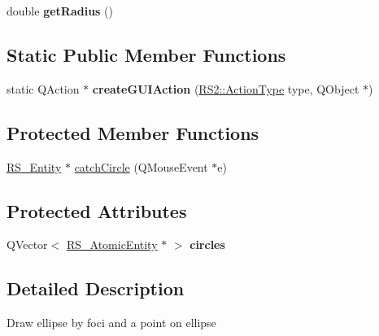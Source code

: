 \begin{DoxyCompactItemize}
\item 
\hypertarget{classRS__ActionDrawCircleTan2_adf0273951204c2c4d395948b033422e0}{double {\bfseries get\-Radius} ()}\label{classRS__ActionDrawCircleTan2_adf0273951204c2c4d395948b033422e0}

\end{DoxyCompactItemize}
\subsection*{Static Public Member Functions}
\begin{DoxyCompactItemize}
\item 
\hypertarget{classRS__ActionDrawCircleTan2_a77b6ab49046c06413214922cef22e671}{static Q\-Action $\ast$ {\bfseries create\-G\-U\-I\-Action} (\hyperlink{classRS2_afe3523e0bc41fd637b892321cfc4b9d7}{R\-S2\-::\-Action\-Type} type, Q\-Object $\ast$)}\label{classRS__ActionDrawCircleTan2_a77b6ab49046c06413214922cef22e671}

\end{DoxyCompactItemize}
\subsection*{Protected Member Functions}
\begin{DoxyCompactItemize}
\item 
\hyperlink{classRS__Entity}{R\-S\-\_\-\-Entity} $\ast$ \hyperlink{classRS__ActionDrawCircleTan2_a2edfc54cdf8236215c1ffdd344a7cc30}{catch\-Circle} (Q\-Mouse\-Event $\ast$e)
\end{DoxyCompactItemize}
\subsection*{Protected Attributes}
\begin{DoxyCompactItemize}
\item 
\hypertarget{classRS__ActionDrawCircleTan2_abd37112790626226b825355120e7374e}{Q\-Vector$<$ \hyperlink{classRS__AtomicEntity}{R\-S\-\_\-\-Atomic\-Entity} $\ast$ $>$ {\bfseries circles}}\label{classRS__ActionDrawCircleTan2_abd37112790626226b825355120e7374e}

\end{DoxyCompactItemize}


\subsection{Detailed Description}
Draw ellipse by foci and a point on ellipse

